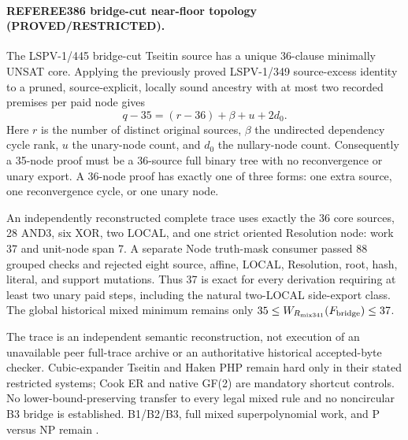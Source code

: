 \paragraph{REFEREE386 bridge-cut near-floor topology (PROVED/RESTRICTED).}
The LSPV-1/445 bridge-cut Tseitin source has a unique 36-clause
minimally UNSAT core.  Applying the previously proved LSPV-1/349
source-excess identity to a pruned, source-explicit, locally sound ancestry
with at most two recorded premises per paid node gives
\[
 q-35=(r-36)+\beta+u+2d_0.
\]
Here $r$ is the number of distinct original sources, $\beta$ the undirected
dependency cycle rank, $u$ the unary-node count, and $d_0$ the nullary-node
count.  Consequently a 35-node proof must be a 36-source full binary tree
with no reconvergence or unary export.  A 36-node proof has exactly one of
three forms: one extra source, one reconvergence cycle, or one unary node.

An independently reconstructed complete trace uses exactly the 36 core
sources, 28 AND3, six XOR, two LOCAL, and one strict oriented Resolution
node: work 37 and unit-node span 7.  A separate Node truth-mask consumer
passed 88 grouped checks and rejected eight source, affine, LOCAL,
Resolution, root, hash, literal, and support mutations.  Thus 37 is exact
for every derivation requiring at least two unary paid steps, including the
natural two-LOCAL side-export class.  The global historical mixed minimum
remains only $35\le W_{R_{\rm mix341}}(F_{\rm bridge})\le37$.

The trace is an independent semantic reconstruction, not execution of an
unavailable peer full-trace archive or an authoritative historical
accepted-byte checker.  Cubic-expander Tseitin and Haken PHP remain hard only
in their stated restricted systems; Cook ER and native GF(2) are mandatory
shortcut controls.  No lower-bound-preserving transfer to every legal mixed
rule and no noncircular B3 bridge is established.  B1/B2/B3, full mixed
superpolynomial work, and P versus NP remain \OPEN.
